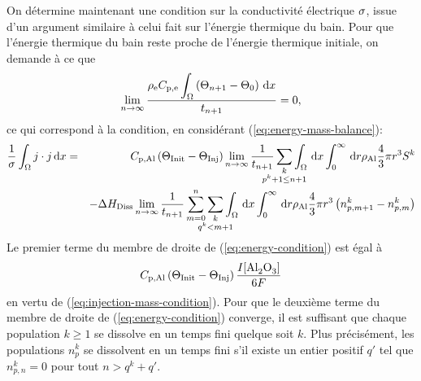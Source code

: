 On détermine maintenant une condition sur la conductivité électrique
$\sigma$, issue d'un argument similaire à celui fait sur
l'énergie thermique du bain. Pour que l'énergie thermique du bain
reste proche de l'énergie thermique initiale, on demande à ce que
\begin{equation}
  \lim_{n\to\infty}\frac{\rho_\mathrm{e}C_{\mathrm{p,e}}\displaystyle\int_\Omega\left( \Theta_{n+1}
    - \Theta_0 \right)\,\mathrm dx}{t_{n+1}} = 0,
\end{equation}
ce qui correspond à la condition, en considérant (\ref{eq:energy-mass-balance}):
\begin{eqnarray}
  \frac{1}{\conductivity} \int_\Omega j\cdot j\intd{x} &=&
  \aluminahc\parent{\tinit - \tinj}\lim_{n\to\infty}\frac{1}{t_{n+1}}\sum_{\mathclap{\substack{k\\ p^k +
  1 \leq n + 1}}}\int_\Omega\intd{x}\int_0^\infty\intd{r}\aluminadensity
  \frac{4}{3}\pi r^3 S^k\nonumber \\
  &&-
       {\aluminadissolutionenthalpy}\lim_{n\to\infty}\frac{1}{t_{n+1}}\sum_{m = 0}^{n}\sum_{\mathclap{\substack{k\\ q^k < m + 1}}} \int_\Omega\intd{x}\int_0^\infty\intd{r} \aluminadensity \frac{4}{3}\pi r^3\parent{n_{p,m+1}^k-n_{p,m}^k}\nonumber\\
       \label{eq:energy-condition}
\end{eqnarray}
Le premier terme du
membre de droite de (\ref{eq:energy-condition}) est égal à
\begin{equation*}
\aluminahc\parent{\tinit-\tinj}  \frac{I[\cee{Al2O3}]}{6F}
\end{equation*}
en vertu de (\ref{eq:injection-mass-condition}). Pour que le deuxième
terme du membre de droite de (\ref{eq:energy-condition}) converge, il
est suffisant que chaque population $k\geq 1$ se dissolve en un temps
fini quelque soit $k$. Plus précisément, les populations $n_p^k$
se dissolvent en un temps fini s'il existe un entier positif $q'$ tel
que $n_{p,n}^k = 0$ pour tout $n > q^k + q'$.

